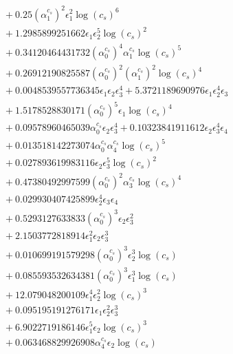 \documentclass[10pt]{article}
\begin{document}
\begin{align*}
&{}  + 0.25 \left(\alpha_{1}^{c_s}\right)^{2} \epsilon_{1}^{2} \log{\left(c_{s} \right)}^{6} \\
&{}  + 1.2985899251662 \epsilon_{1} \epsilon_{2}^{5} \log{\left(c_{s} \right)}^{2} \\
&{}  + 0.34120464431732 \left(\alpha_{0}^{c_s}\right)^{4} \alpha_{1}^{c_s} \log{\left(c_{s} \right)}^{5} \\
&{}  + 0.26912190825587 \left(\alpha_{0}^{c_s}\right)^{2} \left(\alpha_{1}^{c_s}\right)^{2} \log{\left(c_{s} \right)}^{4} \\
&{}  + 0.0048539557736345 \epsilon_{1} \epsilon_{2} \epsilon_{3}^{4} + 5.3721189690976 \epsilon_{1} \epsilon_{2}^{4} \epsilon_{3} \\
&{}  + 1.5178528830171 \left(\alpha_{0}^{c_s}\right)^{5} \epsilon_{1} \log{\left(c_{s} \right)}^{4} \\
&{}  + 0.09578960465039 \alpha_{0}^{c_s} \epsilon_{2} \epsilon_{3}^{4} + 0.10323841911612 \epsilon_{2} \epsilon_{3}^{4} \epsilon_{4} \\
&{}  + 0.013518142273074 \alpha_{0}^{c_s} \alpha_{4}^{c_s} \log{\left(c_{s} \right)}^{5} \\
&{}  + 0.027893619983116 \epsilon_{2} \epsilon_{3}^{5} \log{\left(c_{s} \right)}^{2} \\
&{}  + 0.47380492997599 \left(\alpha_{0}^{c_s}\right)^{2} \alpha_{3}^{c_s} \log{\left(c_{s} \right)}^{4} \\
&{}  + 0.029930407425899 \epsilon_{2}^{4} \epsilon_{3} \epsilon_{4} \\
&{}  + 0.5293127633833 \left(\alpha_{0}^{c_s}\right)^{3} \epsilon_{2} \epsilon_{3}^{2} \\
&{}  + 2.1503772818914 \epsilon_{1}^{2} \epsilon_{2} \epsilon_{3}^{3} \\
&{}  + 0.010699191579298 \left(\alpha_{0}^{c_s}\right)^{3} \epsilon_{2}^{3} \log{\left(c_{s} \right)} \\
&{}  + 0.085593532634381 \left(\alpha_{0}^{c_s}\right)^{3} \epsilon_{1}^{3} \log{\left(c_{s} \right)} \\
&{}  + 12.079048200109 \epsilon_{1}^{4} \epsilon_{2}^{2} \log{\left(c_{s} \right)}^{3} \\
&{}  + 0.095195191276171 \epsilon_{1} \epsilon_{2}^{2} \epsilon_{3}^{3} \\
&{}  + 6.9022719186146 \epsilon_{1}^{5} \epsilon_{2} \log{\left(c_{s} \right)}^{3} \\
&{}  + 0.063468829926908 \alpha_{4}^{c_s} \epsilon_{2} \log{\left(c_{s} \right)} \\

\end{align*}
\end{document}
